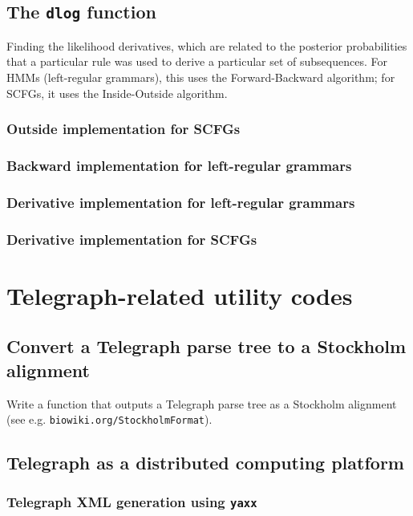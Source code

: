 \documentclass{article}
\begin{document}
\subsection{The {\tt dlog} function}

Finding the likelihood derivatives,
which are related to the posterior probabilities
that a particular rule was used to derive a particular set of subsequences.
For HMMs (left-regular grammars), this uses the Forward-Backward algorithm;
for SCFGs, it uses the Inside-Outside algorithm.

\subsubsection{Outside implementation for SCFGs}

\subsubsection{Backward implementation for left-regular grammars}

\subsubsection{Derivative implementation for left-regular grammars}

\subsubsection{Derivative implementation for SCFGs}

\section{Telegraph-related utility codes}

\subsection{Convert a Telegraph parse tree to a Stockholm alignment}

Write a function that outputs a Telegraph parse tree as a Stockholm alignment
(see e.g. {\tt biowiki.org/StockholmFormat}).

\subsection{Telegraph as a distributed computing platform}

\subsubsection{Telegraph XML generation using {\tt yaxx}}
\end{document}
